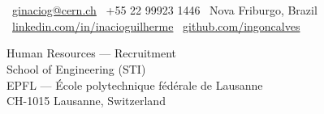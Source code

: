 \documentclass[11pt,a4paper]{article}
\begin{document}

\noindent%
\begin{minipage}[t]{\dimexpr\linewidth-3cm\relax}%
\\[0.4em]
\\[0.8em]
{\color{LightGrey}\small
\faEnvelope\ \href{mailto:ginaciog@cern.ch}{ginaciog@cern.ch}\contactBullet%
\faPhone\ +55 22 99923 1446\contactBullet%
\faMapMarker\ Nova Friburgo, Brazil\\[0.3em]
\faLinkedin\ \href{https://linkedin.com/in/inacioguilherme}{linkedin.com/in/inacioguilherme}\contactBullet%
\faGithub\ \href{https://github.com/ingoncalves}{github.com/ingoncalves}
}%
\end{minipage}%
\hfill%
\begin{minipage}[t]{2.7cm}%
%
\end{minipage}%
\par

\vspace{0.75em}
\dividerLine
\vspace{1.25em}



\vspace{1em}


{\color{SlateGrey}
Human Resources — Recruitment\\
School of Engineering (STI)\\
EPFL — École polytechnique fédérale de Lausanne\\
CH-1015 Lausanne, Switzerland
}

\vspace{1.25em}



\vspace{1em}

\end{document}
